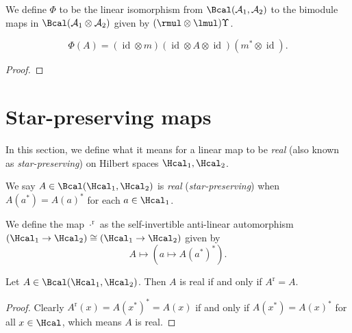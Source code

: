  
 \begin{definition}\label{PhiMap}
  \leanok
  We define $\Phi$ to be the linear isomorphism from $\Bcal(\mathcal{A}_1,\mathcal{A}_2)$ to the bimodule maps in $\Bcal(\mathcal{A}_1\otimes\mathcal{A}_2)$ given by $(\rmul\otimes\lmul)\Upsilon$.
 \end{definition}

 \begin{lemma}\label{rmulMapLmul_apply_Upsilon_eq}
  \leanok
  \[\Phi(A)=(\operatorname{id}\otimes m)(\operatorname{id}\otimes A\otimes\operatorname{id})(m^*\otimes\operatorname{id}).\]
 \end{lemma}
 \begin{proof}
  
 \end{proof}



\chapter{Star-preserving maps}
 In this section, we define what it means for a linear map to be \textit{real} (also known as \textit{star-preserving}) on Hilbert spaces $\Hcal_1,\Hcal_2$.
 
 \begin{definition}\label{LinearMap.IsReal}\leanok
  We say $A\in\Bcal(\Hcal_1,\Hcal_2)$ is \textit{real} (\textit{star-preserving}) when $A(a^*)={A(a)}^*$ for each $a\in\Hcal_1$.
 \end{definition}
 
 \begin{definition}\label{LinearMap.real}\leanok
  We define the map $\cdot^{\operatorname{r}}$ as the self-invertible anti-linear automorphism $(\Hcal_1\to\Hcal_2)\cong(\Hcal_1\to\Hcal_2)$ given by
  \[A\mapsto(a\mapsto{A(a^*)}^*).\]
 \end{definition}

 \begin{lemma}\label{LinearMap.isReal_iff}\leanok
  Let $A\in\Bcal(\Hcal_1,\Hcal_2)$. Then $A$ is real if and only if $A^{\operatorname{r}}=A$.
 \end{lemma}
 \begin{proof}\leanok
  Clearly $A^{\operatorname{r}}(x)={A(x^*)}^*=A(x)$ if and only if $A(x^*)={A(x)}^*$ for all $x\in\Hcal$, which means $A$ is real.
 \end{proof}

